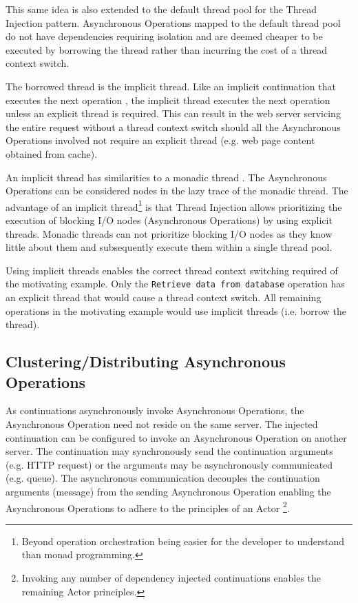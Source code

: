 \documentclass[prodmode]{style/acmlarge}
\begin{document}
This same idea is also extended to the default thread pool for the Thread
Injection pattern.  Asynchronous Operations mapped to the default thread pool do
not have dependencies requiring isolation and are deemed cheaper to be executed
by borrowing the thread rather than incurring the cost of a thread context
switch.

The borrowed thread is the implicit thread.  Like an implicit continuation that
executes the next operation \cite{continuations}, the implicit thread executes
the next operation unless an explicit thread is required.  This can result in
the web server servicing the entire request without a thread context switch
should all the Asynchronous Operations involved not require an explicit thread
(e.g. web page content obtained from cache).

An implicit thread has similarities to a monadic thread \cite{monadic-thread}.
The Asynchronous Operations can be considered nodes in the lazy trace of the
monadic thread.  The advantage of an implicit thread\footnote{Beyond operation
orchestration being easier for the developer to understand than monad
programming.} is that Thread Injection allows prioritizing the execution of
blocking I/O nodes (Asynchronous Operations) by using explicit threads.  Monadic
threads can not prioritize blocking I/O nodes as they know little about them and
subsequently execute them within a single thread pool.

Using implicit threads enables the correct thread context switching required of
the motivating example.  Only the \texttt{Retrieve data from database} operation
has an explicit thread that would cause a thread context switch.  All remaining
operations in the motivating example would use implicit threads (i.e.
borrow the thread).


\subsection{Clustering/Distributing Asynchronous Operations}

As continuations asynchronously invoke Asynchronous Operations, the Asynchronous
Operation need not reside on the same server.  The injected continuation can be
configured to invoke an Asynchronous Operation on another server.  The
continuation may synchronously send the continuation arguments (e.g. HTTP
request) or the arguments may be asynchronously communicated (e.g.
queue).  The asynchronous communication decouples the continuation arguments
(message) from the sending Asynchronous Operation enabling the Asynchronous
Operations to adhere to the principles of an Actor
\cite{actors}\footnote{Invoking any number of dependency injected continuations
enables the remaining Actor principles.}.
\end{document}
